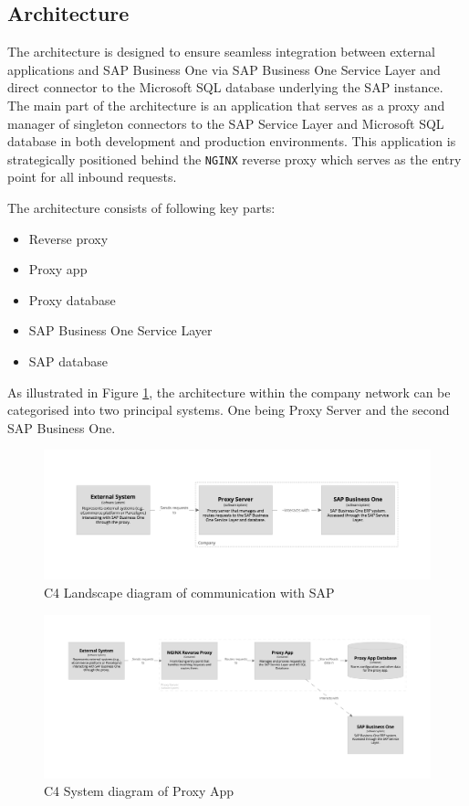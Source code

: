 \subsection{Architecture}
\label{subsec:architecture}
The architecture is designed to ensure seamless integration between external applications and SAP Business One via SAP Business One Service Layer and direct connector to the Microsoft SQL database underlying the SAP instance. 
The main part of the architecture is an application that serves as a proxy and manager of singleton connectors to the SAP Service Layer and Microsoft SQL database in both development and production environments.
This application is strategically positioned behind the \texttt{NGINX} reverse proxy which serves as the entry point for all inbound requests.

The architecture consists of following key parts:
\begin{itemize}
    \item Reverse proxy
    \item Proxy app
    \item Proxy database
    \item SAP Business One Service Layer
    \item SAP database
\end{itemize}

As illustrated in Figure \ref{img07:structurizr:landscape}, the architecture within the company network can be categorised into two principal systems. One being Proxy Server and the second SAP Business One.

\begin{figure}[p]\centering
\includegraphics[width=140mm]{img/chap07/fig_structurizr-landscape.png}
\caption{C4 Landscape diagram of communication with SAP}
\label{img07:structurizr:landscape}
\end{figure}

\begin{figure}[p]\centering
\includegraphics[width=140mm]{img/chap07/fig_structurizr-proxy-system.png}
\caption{C4 System diagram of Proxy App}
\label{img07:structurizr:system:proxy}
\end{figure}

